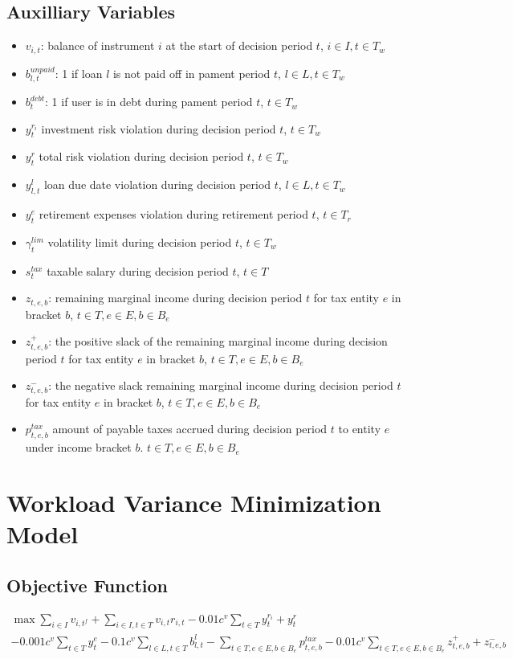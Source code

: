 \documentclass[11pt]{article}
\begin{document}
\subsection{Auxilliary Variables}
\begin{itemize}
    \item $v_{i, t}$: balance of instrument $i$ at the start of decision period $t$, $i \in I, t \in T_w$
    \item $b^{unpaid}_{l, t}$: 1 if loan $l$ is not paid off in pament period $t$, $l \in L, t \in T_w$
    \item $b^{debt}_{t}$: 1 if user is in debt during pament period $t$, $t \in T_w$
    \item $y^{r_i}_{t}$ investment risk violation during decision period $t$, $t \in T_w$
    \item $y^{r}_{t}$ total risk violation during decision period $t$, $t \in T_w$
    \item $y^{l}_{l, t}$ loan due date violation during decision period $t$, $l \in L, t \in T_w$
    \item $y^{e}_{t}$ retirement expenses violation during retirement period $t$, $t \in T_r$
    \item $\gamma^{lim}_t$ volatility limit during decision period $t$, $t \in T_w$
    \item $s^{tax}_{t}$ taxable salary during decision period $t$, $t \in T$
    \item $z_{t, e, b}$: remaining marginal income during decision period $t$ for tax entity $e$ in bracket $b$, $t \in T, e \in E, b \in B_e$
    \item $z^+_{t, e, b}$: the positive slack of the remaining marginal income during decision period $t$ for tax entity $e$ in bracket $b$, $t \in T, e \in E, b \in B_e$
    \item $z^-_{t, e, b}$: the negative slack remaining marginal income during decision period $t$ for tax entity $e$ in bracket $b$, $t \in T, e \in E, b \in B_e$
    \item $p^{tax}_{t, e, b}$ amount of payable taxes accrued during decision period $t$ to entity $e$ under income bracket $b$. $t \in T, e \in E, b \in B_e$
\end{itemize}


\section{Workload Variance Minimization Model}
\subsection{Objective Function}
\begin{multline}
    \max \sum_{i \in I} v_{i, t^f}
          + \sum_{i \in I, t \in T} v_{i, t} r_{i, t}
          - 0.01 c^v \sum_{t \in T} y^{r_i}_{t} + y^{r}_{t} \\
          - 0.001 c^v \sum_{t \in T} y^{e}_{t}
          - 0.1 c^v \sum_{l \in L, t \in T} b^{l}_{l, t}
          - \sum_{t \in T, e \in E, b \in B_e} p^{tax}_{t, e, b}
          - 0.01c^v \sum_{t \in T, e \in E, b \in B_e} z^+_{t, e, b} + z^-_{t, e, b}
\end{multline}
\end{document}
